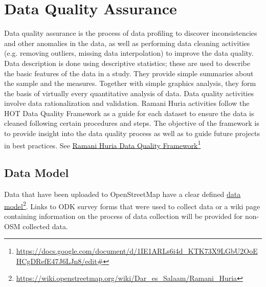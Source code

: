 \documentclass[a4paper,12pt,twoside]{article}
\begin{document}
\section{Data Quality Assurance}
\begin{multicols}{2}
Data quality assurance is the process of data profiling to discover inconsistencies and other anomalies in the data, as well as performing data cleaning activities (e.g. removing outliers, missing data interpolation) to improve the data quality. Data description is done using descriptive statistics; these are used to describe the basic features of the data in a study. They provide simple summaries about the sample and the measures. Together with simple graphics analysis, they form the basis of virtually every quantitative analysis of data. Data quality activities involve data rationalization and validation.
Ramani Huria activities follow the  HOT Data Quality Framework as a guide for each dataset to ensure the data is cleaned following certain procedures and steps. The objective of the framework is to provide insight into the data quality process as well as to guide future projects in best practices.
 See  \href{https://docs.google.com/document/d/1IE1ARLs6i4d_KTK73X9LGbU2OoEHCgDRefE47J6LJn8/edit#}{Ramani Huria Data Quality Framework}\footnote{\url{https://docs.google.com/document/d/1IE1ARLs6i4d_KTK73X9LGbU2OoEHCgDRefE47J6LJn8/edit#}}
\end{multicols}

\subsection{Data Model}
Data that have been uploaded to OpenStreetMap have a clear defined \href{https://wiki.openstreetmap.org/wiki/Dar_es_Salaam/Ramani_Huria}{data model}\footnote{\url{https://wiki.openstreetmap.org/wiki/Dar_es_Salaam/Ramani_Huria}}. Links to ODK survey forms that were used to collect data or a wiki page containing information on the process of data collection will be provided for non-OSM collected data.
\end{document}
